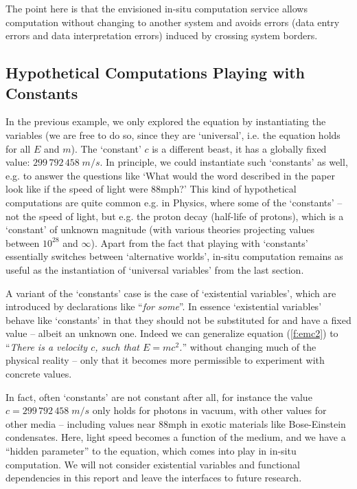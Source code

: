 The point here is that the envisioned in-situ computation service allows computation
without changing to another system and avoids errors (data entry errors and data
interpretation errors) induced by crossing system borders.

\subsection{Hypothetical Computations Playing with Constants}\label{sec:hyp}

In the previous example, we only explored the equation by instantiating the variables (we
are free to do so, since they are `universal', i.e. the equation holds for all $E$ and
$m$). The `constant' $c$ is a different beast, it has a globally fixed value:
$299\, 792\, 458\;m/s$. In principle, we could instantiate such `constants' as well,
e.g. to answer the questions like `What would the word described in the paper look like
if the speed of light were $88 \text{mph}$?' This kind of hypothetical computations are
quite common e.g. in Physics, where some of the `constants' -- not the speed of light,
but e.g. the proton decay (half-life of protons), which is a `constant' of unknown
magnitude (with various theories projecting values between $10^{28}$ and $\infty$). Apart
from the fact that playing with `constants' essentially switches between `alternative
worlds', in-situ computation remains as useful as the instantiation of `universal
variables' from the last section.

A variant of the `constants' case is the case of `existential variables', which are
introduced by declarations like ``\emph{for some}''. In essence `existential variables'
behave like `constants' in that they should not be substituted for and have a fixed value
-- albeit an unknown one. Indeed we can generalize equation (\ref{f:emc2}) to
``\emph{There is a velocity $c$, such that $E=mc^2$.}'' without changing much of the
physical reality -- only that it becomes more permissible to experiment with concrete
values. 

In fact, often `constants' are not constant after all, for instance the value
$c=299\, 792\, 458\;m/s$ only holds for photons in vacuum, with other values for other
media -- including values near $88\text{mph}$ in exotic materials like Bose-Einstein
condensates. Here, light speed becomes a function of the medium, and we have a ``hidden
parameter'' to the equation, which comes into play in in-situ computation. We will not
consider existential variables and functional dependencies in this report and leave the
interfaces to future research.


